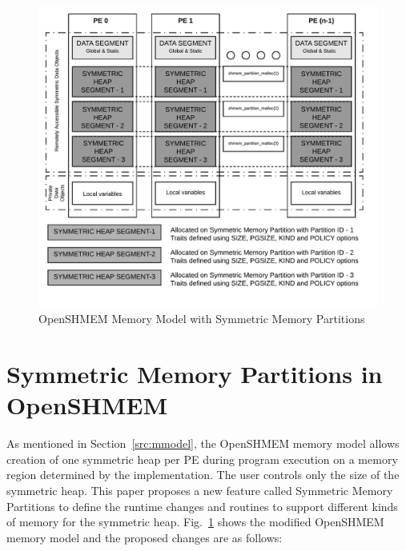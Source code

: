 \begin{figure}[!h]
    \vspace{-25pt}
    \hspace*{5mm}
    \includegraphics[scale=0.20]{image/smem-model.png}
    \vspace{-35pt}
    \caption{OpenSHMEM Memory Model with Symmetric Memory Partitions}
    \vspace{-25pt}
    \label{fig:smem-model}
\end{figure}

\section{Symmetric Memory Partitions in OpenSHMEM}
\label{src:smempart}

As mentioned in Section~\ref{src:mmodel}, the OpenSHMEM memory
model allows creation of one symmetric heap per PE during program
execution on a memory region determined by the implementation. The
user controls only the size of the symmetric heap.
This paper proposes a new feature called
Symmetric Memory Partitions
to define the runtime changes and routines to support different
kinds of memory for the symmetric heap. Fig.~\ref{fig:smem-model}
shows the modified OpenSHMEM memory model and the proposed changes
are as follows:

